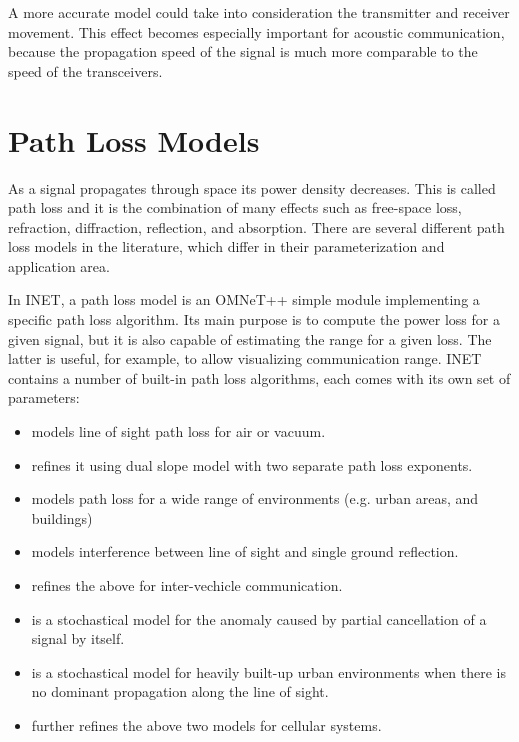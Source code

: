 
A more accurate model could take into consideration the transmitter and
receiver movement. This effect becomes especially important for acoustic
communication, because the propagation speed of the signal is much more
comparable to the speed of the transceivers.

\section{Path Loss Models}

As a signal propagates through space its power density decreases. This is
called path loss and it is the combination of many effects such as
free-space loss, refraction, diffraction, reflection, and absorption. There
are several different path loss models in the literature, which differ in
their parameterization and application area.

In INET, a path loss model is an OMNeT++ simple module implementing a
specific path loss algorithm. Its main purpose is to compute the power loss
for a given signal, but it is also capable of estimating the range for a
given loss. The latter is useful, for example, to allow visualizing
communication range. INET contains a number of built-in path loss
algorithms, each comes with its own set of parameters:

\begin{itemize}
        \item {} models line of sight path loss for air or vacuum.
        \item {} refines it using dual slope model with two separate path loss exponents.
        \item {} models path loss for a wide range of environments (e.g. urban areas, and buildings)
        \item {} models interference between line of sight and single ground reflection.
        \item {} refines the above for inter-vechicle communication.
        \item {} is a stochastical model for the anomaly caused by partial cancellation of a signal by itself.
        \item {} is a stochastical model for heavily built-up urban environments when there is no dominant propagation along the line of sight.
        \item {} further refines the above two models for cellular systems.
\end{itemize}

